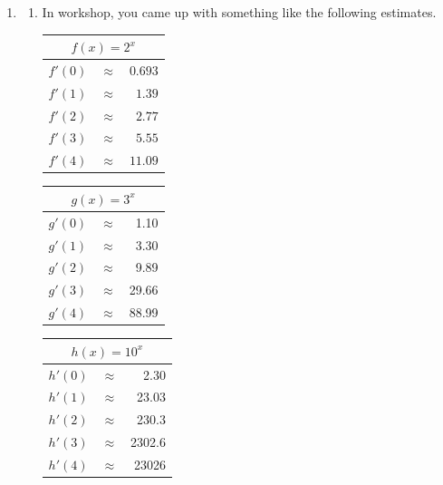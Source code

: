 \documentclass{article}
\begin{document}
\begin{enumerate}
\begin{enumerate}
  \end{enumerate}

\item 
  \begin{enumerate}
  \item \label{guess-derivative-of-b^x}


    In workshop, you came up with something like the following estimates.
    \begin{center}
      \renewcommand{\arraystretch}{1.25}
      \begin{tabular}{rcr}
        \multicolumn{3}{c}{$f(x) = 2^x$} \\
        \hline
        $f'(0)$ & $\approx$ & $ 0.693$ \\
        $f'(1)$ & $\approx$ & $ 1.39$ \\
        $f'(2)$ & $\approx$ & $ 2.77$ \\
        $f'(3)$ & $\approx$ & $ 5.55$ \\
        $f'(4)$ & $\approx$ & $ 11.09$ 
      \end{tabular}
      \hspace{0.5in}
      \begin{tabular}{rcr}
        \multicolumn{3}{c}{$ {g(x) = 3^x}$} \\
        \hline
        $g'(0)$ & $\approx$ & 1.10 \\
        $g'(1)$ & $\approx$ &3.30 \\
        $g'(2)$ & $\approx$ &9.89 \\
        $g'(3)$ & $\approx$ &29.66 \\
        $g'(4)$ & $\approx$ &88.99 
      \end{tabular}
      \hspace{0.5in}
      \begin{tabular}{rcr}
        \multicolumn{3}{c}{$ {h(x) = 10^x}$} \\
        \hline
        $h'(0)$ & $\approx$ &2.30 \\
        $h'(1)$ & $\approx$ & 23.03\\
        $h'(2)$ & $\approx$ & 230.3\\
        $h'(3)$ & $\approx$ &2302.6 \\
        $h'(4)$ & $\approx$ &23026 
      \end{tabular}
    \end{center}


\end{enumerate}
\end{enumerate}
\end{document}
